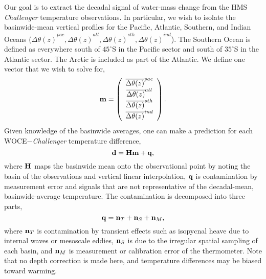 \documentclass[12pt]{article}
\begin{document}
Our goal is to extract the decadal signal of water-mass change from the HMS {\it Challenger} temperature observations. In particular, we wish to isolate the basinwide-mean vertical profiles for the Pacific, Atlantic, Southern, and Indian Oceans ($\overline{\Delta \theta(z)}^{pac},\overline{\Delta \theta(z)}^{atl},\overline{\Delta \theta(z)}^{sth}, \overline{\Delta \theta(z)}^{ind}$). The Southern Ocean is defined as everywhere south of $45^\circ$S in the Pacific sector and south of $35^{\circ}$S in the Atlantic sector. The Arctic is included as part of the Atlantic. We define one vector that we wish to solve for,
\begin{equation}
{\bf m} = \left(\begin{array}{c} \overline{\Delta \theta(z)}^{pac} \\\overline{\Delta \theta(z)}^{atl} \\\overline{\Delta \theta(z)}^{sth} \\\overline{\Delta \theta(z)}^{ind} 
 \end{array} \right). 
\end{equation}
Given knowledge of the basinwide averages, one can make a prediction for each WOCE$-${\it Challenger} temperature difference,
\begin{equation}
{\bf d} = {\bf Hm} + {\bf q},
\end{equation}
where ${\bf H}$ maps the basinwide mean onto the observational point by noting the basin of the observations and vertical linear interpolation, ${\bf q}$ is contamination by measurement error and signals that are not representative of the decadal-mean, basinwide-average temperature. The contamination is decomposed into three parts,
\begin{equation}
{\bf q} = {\bf n}_T + {\bf n}_S + {\bf n}_M,
\end{equation}
where ${\bf n}_T$ is contamination by transient effects such as isopycnal heave due to internal waves or mesoscale eddies, ${\bf n}_S$ is due to the irregular spatial sampling of each basin, and ${\bf n}_M$ is measurement or calibration error of the thermometer. Note that no depth correction is made here, and temperature differences may be biased toward warming. 
\end{document}
